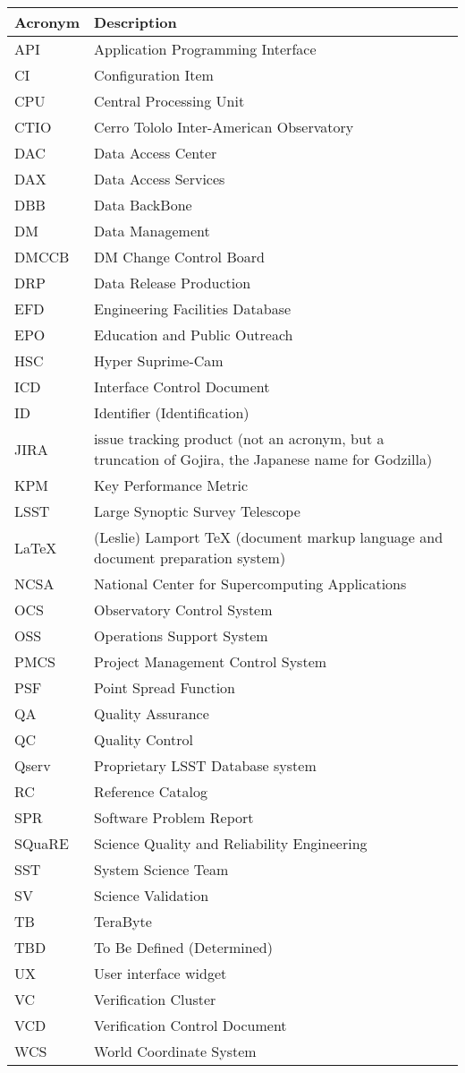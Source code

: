 \addtocounter{table}{-1}
\begin{longtable}{|l|p{}|}\hline 
\textbf{Acronym} & \textbf{Description}  \\\hline
API&Application Programming Interface \\\hline
CI&Configuration Item \\\hline
CPU&Central Processing Unit \\\hline
CTIO&Cerro Tololo Inter-American Observatory \\\hline
DAC&Data Access Center \\\hline
DAX&Data Access Services \\\hline
DBB&Data BackBone \\\hline
DM&Data Management \\\hline
DMCCB&DM Change Control Board \\\hline
DRP&Data Release Production \\\hline
EFD&Engineering Facilities Database \\\hline
EPO&Education and Public Outreach \\\hline
HSC&Hyper Suprime-Cam \\\hline
ICD&Interface Control Document \\\hline
ID&Identifier (Identification) \\\hline
JIRA&issue tracking product (not an acronym, but a truncation of Gojira, the Japanese name for Godzilla) \\\hline
KPM&Key Performance Metric \\\hline
LSST&Large Synoptic Survey Telescope \\\hline
LaTeX&(Leslie) Lamport TeX (document markup language and document preparation system) \\\hline
NCSA&National Center for Supercomputing Applications \\\hline
OCS&Observatory Control System \\\hline
OSS&Operations Support System \\\hline
PMCS&Project Management Control System \\\hline
PSF&Point Spread Function \\\hline
QA&Quality Assurance \\\hline
QC&Quality Control \\\hline
Qserv&Proprietary LSST Database system \\\hline
RC&Reference Catalog \\\hline
SPR&Software Problem Report \\\hline
SQuaRE&Science Quality and Reliability Engineering \\\hline
SST&System Science Team \\\hline
SV&Science Validation \\\hline
TB&TeraByte \\\hline
TBD&To Be Defined (Determined) \\\hline
UX&User interface widget \\\hline
VC&Verification Cluster \\\hline
VCD&Verification Control Document \\\hline
WCS&World Coordinate System \\\hline
\end{longtable}
